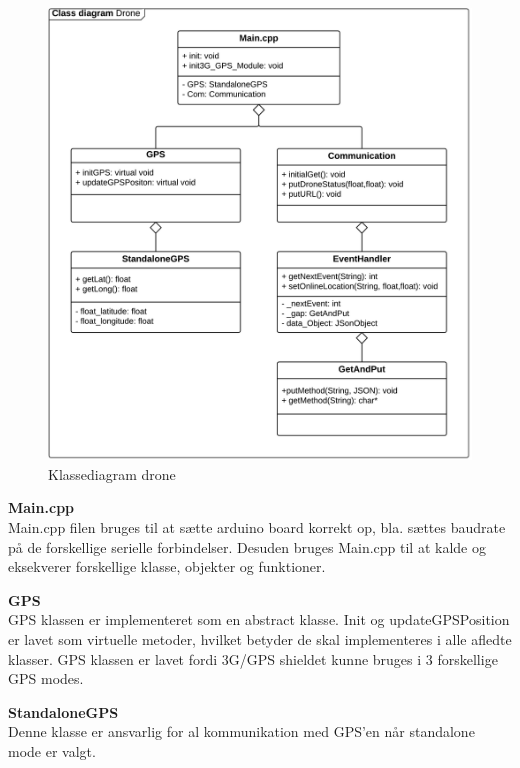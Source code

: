 \begin{figure}[H]
	\centering
	\includegraphics[width=1\textwidth]{Billeder/klasse_diagrammer/classdiagram_iteration1.png}
	\vspace{-0.5cm}
	\caption{Klassediagram drone}
	\label{fig:classDiagram_iteration1}
\end{figure}

\newpage

\textbf{Main.cpp} \\
Main.cpp filen bruges til at sætte arduino board korrekt op, bla. sættes baudrate på de forskellige serielle forbindelser. Desuden bruges Main.cpp til at kalde og eksekverer forskellige klasse, objekter og funktioner.

\textbf{GPS} \\
GPS klassen er implementeret som en abstract klasse. Init og updateGPSPosition er lavet som virtuelle metoder, hvilket betyder de skal implementeres i alle afledte klasser. GPS klassen er lavet fordi 3G/GPS shieldet kunne bruges i 3 forskellige GPS modes. 

\textbf{StandaloneGPS}\\
Denne klasse er ansvarlig for al kommunikation med GPS'en når standalone mode er valgt. 

